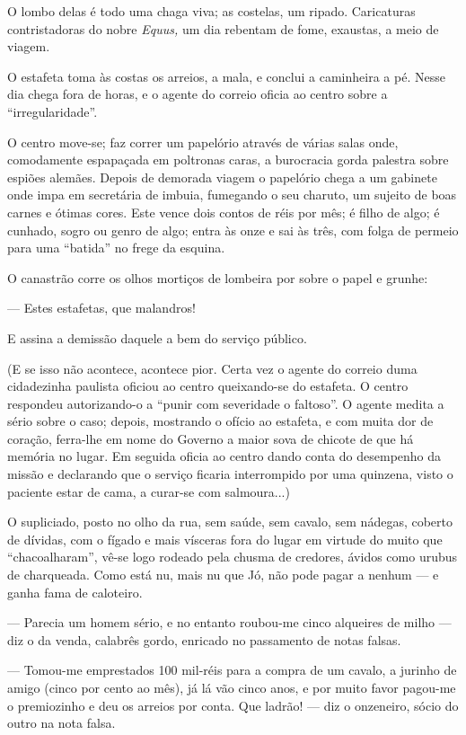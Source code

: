 O lombo delas é todo uma chaga viva; as costelas, um ripado. Caricaturas
contristadoras do nobre \emph{Equus,} um dia rebentam de fome, exaustas,
a meio de viagem.

O estafeta toma às costas os arreios, a mala, e conclui a caminheira a
pé. Nesse dia chega fora de horas, e o agente do correio oficia ao
centro sobre a ``irregularidade''.

O centro move-se; faz correr um papelório através de várias salas onde,
comodamente espapaçada em poltronas caras, a burocracia gorda palestra
sobre espiões alemães. Depois de demorada viagem o papelório chega a um
gabinete onde impa em secretária de imbuia, fumegando o seu charuto, um
sujeito de boas carnes e ótimas cores. Este vence dois contos de réis
por mês; é filho de algo; é cunhado, sogro ou genro de algo; entra às
onze e sai às três, com folga de permeio para uma ``batida'' no frege da
esquina.

O canastrão corre os olhos mortiços de lombeira por sobre o papel e
grunhe:

--- Estes estafetas, que malandros!

E assina a demissão daquele a bem do serviço público.

(E se isso não acontece, acontece pior. Certa vez o agente do correio
duma cidadezinha paulista oficiou ao centro queixando-se do estafeta. O
centro respondeu autorizando-o a ``punir com severidade o faltoso''. O
agente medita a sério sobre o caso; depois, mostrando o ofício ao
estafeta, e com muita dor de coração, ferra-lhe em nome do Governo a
maior sova de chicote de que há memória no lugar. Em seguida oficia ao
centro dando conta do desempenho da missão e declarando que o serviço
ficaria interrompido por uma quinzena, visto o paciente estar de cama, a
curar-se com salmoura...)

O supliciado, posto no olho da rua, sem saúde, sem cavalo, sem nádegas,
coberto de dívidas, com o fígado e mais vísceras fora do lugar em
virtude do muito que ``chacoalharam'', vê-se logo rodeado pela chusma de
credores, ávidos como urubus de charqueada. Como está nu, mais nu que
Jó, não pode pagar a nenhum --- e ganha fama de caloteiro.

--- Parecia um homem sério, e no entanto roubou-me cinco alqueires de
milho --- diz o da venda, calabrês gordo, enricado no passamento de
notas falsas.

--- Tomou-me emprestados 100 mil-réis para a compra de um cavalo, a
jurinho de amigo (cinco por cento ao mês), já lá vão cinco anos, e por
muito favor pagou-me o premiozinho e deu os arreios por conta. Que
ladrão! --- diz o onzeneiro, sócio do outro na nota falsa.

